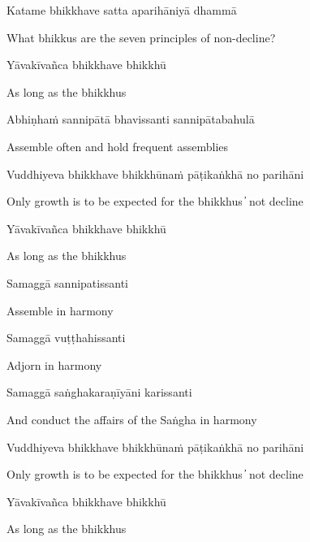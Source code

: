 Katame bhikkhave satta aparihāniyā dhammā

\begin{cprenglish}
  What bhikkus are the seven principles of non-decline?
\end{cprenglish}

Yāvakīvañca bhikkhave bhikkhū

\begin{cprenglish}
  As long as the bhikkhus
\end{cprenglish}

Abhiṇhaṁ sannipātā bhavissanti sannipātabahulā

\begin{cprenglish}
  Assemble often and hold frequent assemblies
\end{cprenglish}

Vuddhiyeva bhikkhave bhikkhūnaṁ pāṭikaṅkhā no parihāni

\begin{cprenglish}
  Only growth is to be expected for the bhikkhus  ̓  not decline
\end{cprenglish}

Yāvakīvañca bhikkhave bhikkhū

\begin{cprenglish}
  As long as the bhikkhus
\end{cprenglish}

Samaggā sannipatissanti

\begin{cprenglish}
  Assemble in harmony
\end{cprenglish}

Samaggā vuṭṭhahissanti

\begin{cprenglish}
  Adjorn in harmony
\end{cprenglish}

Samaggā saṅghakaraṇīyāni karissanti

\begin{cprenglish}
  And conduct the affairs of the Saṅgha in harmony
\end{cprenglish}

Vuddhiyeva bhikkhave bhikkhūnaṁ pāṭikaṅkhā no parihāni

\begin{cprenglish}
  Only growth is to be expected for the bhikkhus  ̓  not decline
\end{cprenglish}

Yāvakīvañca bhikkhave bhikkhū

\begin{cprenglish}
  As long as the bhikkhus
\end{cprenglish}

